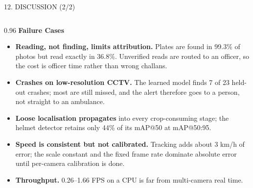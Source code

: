 \documentclass[aspectratio=169,10pt,t]{beamer}
\newcommand{\hd}[1]{{\color{dsblue}\textbf{#1}}}          %
\begin{document}
\begin{frame}{12. DISCUSSION (2/2)}
\small
\begin{columns}[T,onlytextwidth]
\begin{column}{0.96\textwidth}
\hd{Failure Cases}
\begin{itemize}\setlength{\itemsep}{0.3em}
  \item \textbf{Reading, not finding, limits attribution.} Plates are found in 99.3\% of photos but read exactly in
        36.8\%. Unverified reads are routed to an officer, so the cost is officer time rather than wrong challans.
  \item \textbf{Crashes on low-resolution CCTV.} The learned model finds 7 of 23 held-out crashes; most are still
        missed, and the alert therefore goes to a person, not straight to an ambulance.
  \item \textbf{Loose localisation propagates} into every crop-consuming stage; the helmet detector retains only 44\%
        of its mAP@50 at mAP@50:95.
  \item \textbf{Speed is consistent but not calibrated.} Tracking adds about 3 km/h of error; the scale constant and
        the fixed frame rate dominate absolute error until per-camera calibration is done.
  \item \textbf{Throughput.} 0.26--1.66 FPS on a CPU is far from multi-camera real time.
\end{itemize}
\end{column}
\end{columns}
\end{frame}
\end{document}
